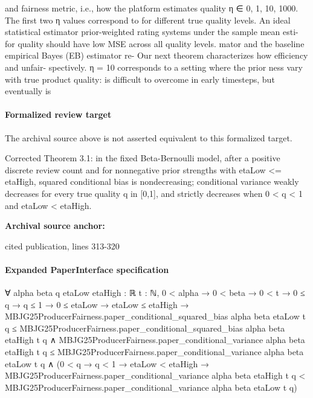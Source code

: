 \documentclass[10pt]{article}
\begin{document}
\begin{ReviewVerbatim}
and fairness metric, i.e., how the platform estimates quality                  η ∈ {0, 1, 10, 1000}. The first two η values correspond to
for different true quality levels. An ideal statistical estimator              prior-weighted rating systems under the sample mean esti-
for quality should have low MSE across all quality levels.                     mator and the baseline empirical Bayes (EB) estimator re-
Our next theorem characterizes how efficiency and unfair-                      spectively. η = 10 corresponds to a setting where the prior
ness vary with true product quality:                                           is difficult to overcome in early timesteps, but eventually is
\end{ReviewVerbatim}


\paragraph{Formalized review target}
The archival source above is not asserted equivalent to this formalized target.
\begin{ReviewVerbatim}
Corrected Theorem 3.1: in the fixed Beta-Bernoulli model, after a positive discrete review count and for nonnegative prior strengths with etaLow <= etaHigh, squared conditional bias is nondecreasing; conditional variance weakly decreases for every true quality q in [0,1], and strictly decreases when 0 < q < 1 and etaLow < etaHigh.
\end{ReviewVerbatim}

\textbf{Archival source anchor:} {\footnotesize\raggedright cited publication, lines 313-\allowbreak{}320\par}
\paragraph{Expanded PaperInterface specification}
\begin{ReviewVerbatim}
∀ {alpha beta q etaLow etaHigh : ℝ} {t : ℕ},
  0 < alpha →
    0 < beta →
      0 < t →
        0 ≤ q →
          q ≤ 1 →
            0 ≤ etaLow →
              etaLow ≤ etaHigh →
                MBJG25ProducerFairness.paper_conditional_squared_bias alpha beta etaLow t q ≤
                    MBJG25ProducerFairness.paper_conditional_squared_bias alpha beta etaHigh t q ∧
                  MBJG25ProducerFairness.paper_conditional_variance alpha beta etaHigh t q ≤
                      MBJG25ProducerFairness.paper_conditional_variance alpha beta etaLow t q ∧
                    (0 < q →
                      q < 1 →
                        etaLow < etaHigh →
                          MBJG25ProducerFairness.paper_conditional_variance alpha beta etaHigh t q <
                            MBJG25ProducerFairness.paper_conditional_variance alpha beta etaLow t q)
\end{ReviewVerbatim}
\end{document}
